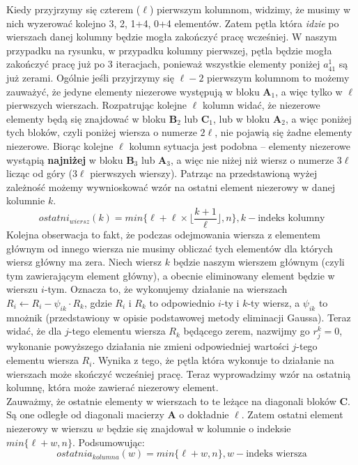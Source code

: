 \documentclass[]{article}
\newcommand{\mA}{\bm{A}}
\newcommand{\mB}{\bm{B}}
\newcommand{\mC}{\bm{C}}
\begin{document}
	Kiedy przyjrzymy się czterem ($\ell$) pierwszym kolumnom, widzimy, że musimy w nich wyzerować kolejno 3, 2, 1+4, 0+4 elementów. Zatem pętla która \textit{idzie} po wierszach danej kolumny będzie mogła zakończyć pracę wcześniej. W naszym przypadku na rysunku, w przypadku kolumny pierwszej, pętla będzie mogła zakończyć pracę już po 3 iteracjach, ponieważ wszystkie elementy poniżej $a^1_{41}$ są już zerami.
	Ogólnie jeśli przyjrzymy się $\ell -2$ pierwszym kolumnom to możemy zauważyć, że jedyne elementy niezerowe występują w bloku $\mA_1$, a więc tylko w $\ell$ pierwszych wierszach. Rozpatrując kolejne $\ell$ kolumn widać, że niezerowe elementy będą się znajdować w bloku $\mB_2$ lub $\mC_1$, lub w bloku $\mA_2$, a więc poniżej tych bloków, czyli poniżej wiersza o numerze $2\ell$, nie pojawią się żadne elementy niezerowe. Biorąc kolejne $\ell$ kolumn sytuacja jest podobna -- elementy niezerowe wystąpią \textbf{najniżej} w bloku $\mB_3$ lub $\mA_3$, a więc nie niżej niż wiersz o numerze $3\ell$ licząc od góry ($3\ell$ pierwszych wierszy). Patrząc na przedstawioną wyżej zależność możemy wywnioskować wzór na ostatni element niezerowy w danej kolumnie $k$. 
	$$ ostatni_{wiersz}(k) = min\lbrace \ell + \ell \times \lfloor \frac{k+1}{\ell}\rfloor , n \rbrace, k - \text{indeks kolumny} $$
	Kolejna obserwacja to fakt, że podczas odejmowania wiersza z elementem głównym od innego wiersza nie musimy obliczać tych elementów dla których wiersz główny ma zera. Niech wiersz $k$ będzie naszym wierszem głównym (czyli tym zawierającym element główny), a obecnie eliminowany element będzie w wierszu $i$-tym. Oznacza to, że wykonujemy działanie na wierszach $ R_i \leftarrow R_i -\psi_{ik} \cdot R_k$, gdzie $R_i$ i $R_k$ to odpowiednio $i$-ty i $k$-ty wiersz, a $\psi_{ik}$ to mnożnik (przedstawiony w opisie podstawowej metody eliminacji Gaussa). Teraz widać, że dla $j$-tego elementu wiersza $R_k$ będącego zerem, nazwijmy go $r^k_j = 0$, wykonanie powyższego działania nie zmieni odpowiedniej wartości $j$-tego elementu wiersza $R_i$. Wynika z tego, że pętla która wykonuje to działanie na wierszach może skończyć wcześniej pracę. Teraz wyprowadzimy wzór na ostatnią kolumnę, która może zawierać niezerowy element.\\
	Zauważmy, że ostatnie elementy w wierszach to te leżące na diagonali bloków $\mC$. Są one odległe od diagonali macierzy $\mA$ o dokładnie $\ell$. Zatem ostatni element niezerowy w wierszu $w$ będzie się znajdował w kolumnie o indeksie $min\lbrace \ell + w , n \rbrace $. Podsumowując:
	$$ ostatnia_{kolumna}(w) = min\lbrace \ell + w , n \rbrace, w - \text{indeks wiersza} $$
\end{document}
